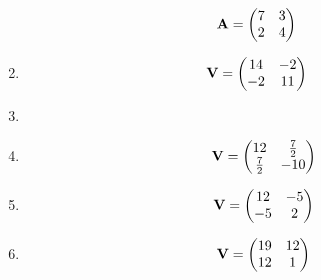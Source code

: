 \documentclass[journal,12pt,twocolumn]{IEEEtran}
\renewcommand\thesection{\arabic{section}}
\begin{document}
\begin{enumerate}[label=\thesection.\arabic*.,ref=\thesection.\theenumi]
\begin{align}
    \mathbf{A} &= \begin{pmatrix} 7 & 3 \\ 2 & 4\end{pmatrix} 
\end{align}
%
%
\item  
\begin{align}
\mathbf{V} &= \begin{pmatrix} 14  & -2 \\ -2 & 11\end{pmatrix}
\end{align}
%
\item 
%
%
%
\item 
	\begin{equation}
	\mathbf{V} = \begin{pmatrix} 12 & \frac{7}{2}\\ \frac{7}{2} & -10\end{pmatrix}
\end{equation}

%
\item   
\begin{equation}
	\mathbf{V} = \begin{pmatrix} 12 & -5\\ -5 & 2\end{pmatrix}
\end{equation}

%
%
\item  
\begin{align}
    \mathbf{V} = \begin{pmatrix} 19 & 12 \\12 & 1\end{pmatrix} \label{eq:solutions/decomp/4/1/42/1.1}
\end{align}

\end{enumerate}
 
\end{document}
